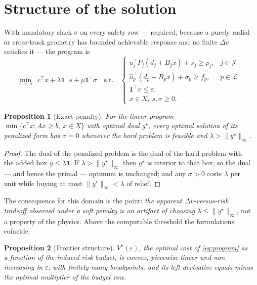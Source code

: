 \documentclass[11pt]{article}
\newtheorem{proposition}{Proposition}
\theoremstyle{definition}
\theoremstyle{remark}
\newcommand{\dv}{\Delta v}
\newcommand{\norm}[1]{\lVert #1 \rVert}
\begin{document}
\section{Structure of the solution}

With mandatory slack $\sigma$ on every safety row --- required, because a
purely radial or cross-track geometry has bounded achievable response and no
finite $\dv$ satisfies it --- the program is
\begin{equation}
\min_{x,\,s,\,\sigma}\ \ c^{\!\top}x + \lambda \mathbf{1}^{\!\top}s + \mu \mathbf{1}^{\!\top}\sigma
\quad \text{s.t.} \quad
\begin{cases}
u_j^{\!\top}P_j(d_j + B_jx) + s_j \ge \rho_j, & j \in \mathcal{J}\\
\hat u_p^{\!\top}(d_p + B_px) + \sigma_p \ge f_p, & p \in \mathcal{L}\\
\mathbf{1}^{\!\top}\sigma \le \varepsilon, & \\
x \in X, \ s,\sigma \ge 0. &
\end{cases}
\label{eq:program}
\end{equation}

\begin{proposition}[Exact penalty]
\label{prop:penalty}
For the linear program $\min\{c^{\!\top}x : Ax \ge b,\ x \in X\}$ with optimal
dual $y^\star$, every optimal solution of its penalized form has $\sigma = 0$
whenever the hard problem is feasible and $\lambda > \norm{y^\star}_\infty$.
\end{proposition}

\begin{proof}
The dual of the penalized problem is the dual of the hard problem with the
added box $y \le \lambda\mathbf{1}$. If $\lambda > \norm{y^\star}_\infty$ then
$y^\star$ is interior to that box, so the dual --- and hence the primal ---
optimum is unchanged; and any $\sigma>0$ costs $\lambda$ per unit while buying
at most $\norm{y^\star}_\infty < \lambda$ of relief.
\end{proof}

The consequence for this domain is the point: \emph{the apparent
$\dv$-versus-risk tradeoff observed under a soft penalty is an artifact of
choosing $\lambda \le \norm{y^\star}_\infty$}, not a property of the physics.
Above the computable threshold the formulations coincide.

\begin{proposition}[Frontier structure]
\label{prop:frontier}
$V^\star(\varepsilon)$, the optimal cost of \eqref{eq:program} as a function of
the induced-risk budget, is convex, piecewise linear and non-increasing in
$\varepsilon$, with finitely many breakpoints, and its left derivative equals
minus the optimal multiplier of the budget row.
\end{proposition}
\end{document}
